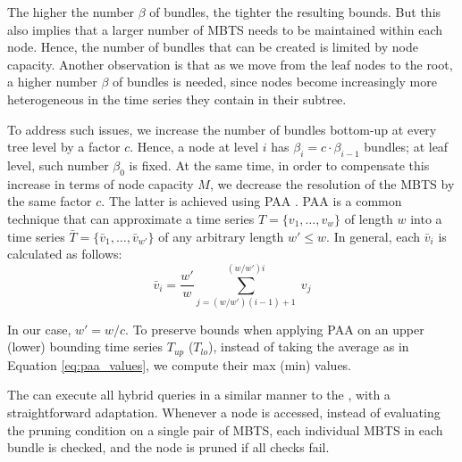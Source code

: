 The higher the number $\beta$ of bundles, the tighter the resulting bounds. But this also implies that a larger number of MBTS needs to be maintained within each node. Hence, the number of bundles that can be created is limited by node capacity. Another observation is that as we move from the leaf nodes to the root, a higher number $\beta$ of bundles is needed, since nodes become increasingly more heterogeneous in the time series they contain in their subtree.

To address such issues, we increase the number of bundles bottom-up at every tree level by a factor $c$. Hence, a node at level $i$ has $\beta_{i} = c \cdot \beta_{i-1}$ bundles; at leaf level, such number $\beta_0$ is fixed. At the same time, in order to compensate this increase in terms of node capacity $M$, we decrease the resolution of the MBTS by the same factor $c$. The latter is achieved using PAA \cite{keogh2001paa,faloutsos2000vldb}. PAA is a common technique that can approximate a time series $T = \{v_1, \ldots, v_w\}$ of length $w$ into a time series $\bar{T} = \{\bar{v}_1, \ldots, \bar{v}_{w'}\}$ of any arbitrary length $w' \leq w$. In general, each $\bar{v}_i$ is calculated as follows:
\begin{equation}
 \bar{v}_i = \frac{w'}{w} \sum_{j = (w/w')(i-1)+1}^{(w/w')i} \; v_j
 \label{eq:paa_values}
\end{equation}

In our case, $w' = w / c$. To preserve bounds when applying PAA on an upper (lower) bounding time series $T_{up}$ ($T_{lo}$), instead of taking the average as in Equation \ref{eq:paa_values}, we compute their max (min) values.

The \ctsr can execute all hybrid queries in a similar manner to the \tsr, with a straightforward adaptation. Whenever a node is accessed, instead of evaluating the pruning condition on a single pair of MBTS, each individual MBTS in each bundle is checked, and the node is pruned if all checks fail.



%

